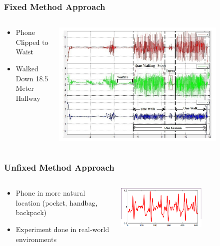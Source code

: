 \documentclass{beamer}
\begin{document}
\begin{frame}
  \frametitle{Fixed Method Approach}
  \begin{columns}
  \begin{column}{0.4\textwidth}
  \begin{itemize}
    \item Phone Clipped to Waist 
  	\linebreak
  	\item Walked Down 18.5 Meter Hallway
  \end{itemize}
  \end{column}
  \begin{column}{0.8\textwidth}
   \includegraphics[width=0.8\textwidth]{Illustrations/gaitpatterns.png}
       \\
  \end{column}
  \end{columns}
\end{frame}

\begin{frame}
  \frametitle{Unfixed Method Approach}

  \begin{columns}
  \begin{column}{0.6\textwidth}
  \begin{itemize}
    \item Phone in more natural location (pocket, handbag, backpack)
  	\linebreak
  	\item Experiment done in real-world environments
  \end{itemize}
  \end{column}
  \begin{column}{0.7\textwidth}
   \includegraphics[width=0.6\textwidth]{Illustrations/Framing.png}
  \end{column}
  \end{columns}
\end{frame}
\end{document}
